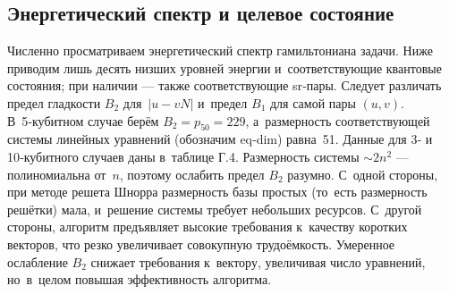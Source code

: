 \begin{table}[h]
    \centering
    \caption{
        Кодирование кубитов для 10‑кубитного случая. Подскрипт~«$j$» убывает
        слева направо.
    }
    \label{tab:tab5}
\end{table}


\subsection*{Энергетический спектр и целевое состояние}

Численно просматриваем энергетический спектр гамильтониана задачи. Ниже
приводим лишь десять низших уровней энергии и~соответствующие квантовые
состояния; при наличии — также соответствующие sr‑пары. Следует различать
предел гладкости $B_{2}$ для~$|u-vN|$ и~предел $B_{1}$ для самой пары $(u,v)$.
В~5‑кубитном случае берём $B_{2}=p_{50}=229$, а~размерность соответствующей
системы линейных уравнений (обозначим eq‑dim) равна~51. Данные для 3‑ и
10‑кубитного случаев даны в таблице Г.4. Размерность системы $\sim 2n^{2}$ —
полиномиальна от $n$, поэтому ослабить предел $B_{2}$ разумно. С одной стороны,
при методе решета Шнорра размерность базы простых (то есть размерность решётки)
мала, и решение системы требует небольших ресурсов. С другой стороны, алгоритм
предъявляет высокие требования к качеству коротких векторов, что резко
увеличивает совокупную трудоёмкость. Умеренное ослабление $B_{2}$ снижает
требования к вектору, увеличивая число уравнений, но в целом повышая
эффективность алгоритма.

